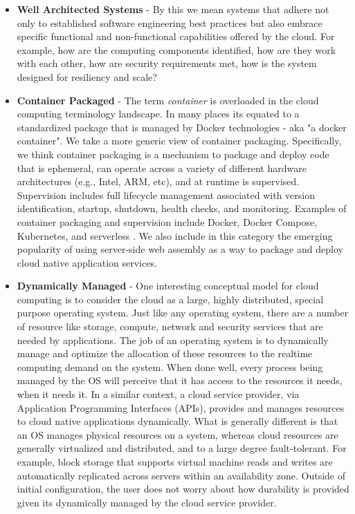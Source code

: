 \documentclass[conference]{IEEEconf}
\begin{document}
\begin{itemize}
	\item \textbf{Well Architected Systems} - By this we mean systems that adhere not only to established software engineering best practices but also embrace specific functional and non-functional capabilities offered by the cloud. For example, how are the computing components identified, how are they work with each other, how are security requirements met, how is the system designed for resiliency and scale?
	
	\item  \textbf{Container Packaged} - The term \textit{container} is overloaded in the cloud computing terminology landscape.  In many places its equated to a standardized package that is managed by Docker\cite{DockerContainer} technologies - aka "a docker container".  We take a more generic view of container packaging. Specifically, we think container packaging is a mechanism to package and deploy code that is ephemeral, can operate across a variety of different hardware architectures (e.g., Intel, ARM, etc), and at runtime is supervised.  Supervision includes full lifecycle management associated with version identification, startup, shutdown, health checks, and monitoring.  Examples of container packaging and supervision include Docker, Docker Compose, Kubernetes, and serverless \cite{baldini2017serverless}. We also include in this category the emerging popularity of using server-side web assembly\cite{haas2017bringing, bosshard2020use} as a way to package and deploy cloud native application services. 

	\item \textbf{Dynamically Managed} - One interesting conceptual model for cloud computing is to consider the cloud as a large, highly distributed, special purpose operating system. Just like any operating system, there are a number of resource like storage, compute, network and security services that are needed by applications.  The job of an operating system is to dynamically manage and optimize the allocation of these resources to the realtime computing demand on the system.  When done well, every process being managed by the OS will perceive that it has access to the resources it needs, when it needs it.  In a similar context, a cloud service provider, via Application Programming Interfaces (APIs), provides and manages resources to cloud native applications dynamically. What is generally different is that an OS manages physical resources on a system, whereas cloud resources are generally virtualized and distributed, and to a large degree fault-tolerant.  For example, block storage that supports virtual machine reads and writes are automatically replicated across servers within an availability zone. Outside of initial configuration, the user does not worry about how durability is provided given its dynamically managed by the cloud service provider. 
	
	 
\end{itemize} 
\end{document}
